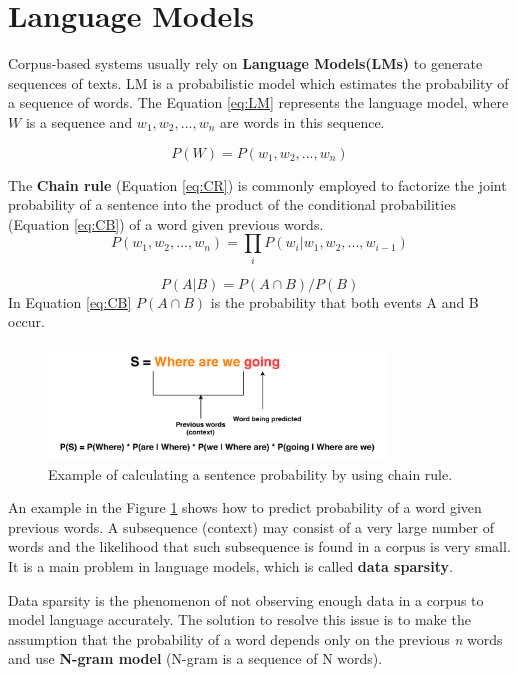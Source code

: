 \section{Language Models}
Corpus-based systems usually rely on \textbf{Language Models(LMs)} to generate sequences of texts. LM is a probabilistic model which estimates the probability of a sequence of words. The Equation \ref{eq:LM} represents the language model, where $W$ is a sequence and $w_1, w_2, ..., w_n$ are words in this sequence. 

\begin{equation} \label{eq:LM}
P(W) = P(w_1, w_2, ..., w_n)
\end{equation}

The \textbf{Chain rule} (Equation \ref{eq:CR}) is commonly employed to factorize the joint probability of a sentence into the product of the conditional probabilities (Equation \ref{eq:CB}) of a word given previous words. 
\begin{equation} \label{eq:CR}
P(w_1, w_2,..., w_n) = \prod_{i}P(w_i|w_1, w_2,...,w_{i-1})
\end{equation}

\begin{equation} \label{eq:CB}
P(A|B) = P(A \cap B) / P(B)
\end{equation}
In Equation \ref{eq:CB} $P(A \cap B)$ is the probability that both events A and B occur.

\begin{figure}[hbt]
  \centering
  \includegraphics[width=0.8\textwidth]{figures/lm.pdf}
  \caption{Example of calculating a sentence probability by using chain rule.}
  \label{chain_rule}
\end{figure}

An example in the Figure \ref{chain_rule} shows how to predict probability of a word given previous words. A subsequence (context) may consist of a very large number of words and the likelihood that such subsequence is found in a corpus is very small. It is a main problem in language models, which is called \textbf{data sparsity}.

Data sparsity is the phenomenon of not observing enough data in a corpus to model language accurately. The solution to resolve this issue is to make the assumption that the probability of a word depends only on the previous \textit{n} words and use \textbf{N-gram model} (N-gram is a sequence of N words).


